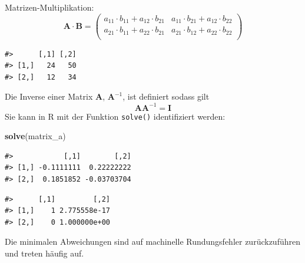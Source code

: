 \documentclass[]{book}
\newenvironment{Shaded}{\begin{snugshade}}{\end{snugshade}}
\newcommand{\KeywordTok}[1]{\textcolor[rgb]{0.13,0.29,0.53}{\textbf{#1}}}
\newcommand{\StringTok}[1]{\textcolor[rgb]{0.31,0.60,0.02}{#1}}
\newcommand{\OperatorTok}[1]{\textcolor[rgb]{0.81,0.36,0.00}{\textbf{#1}}}
\newcommand{\NormalTok}[1]{#1}
\begin{document}
Matrizen-Multiplikation: \[\boldsymbol{A}\cdot\boldsymbol{B}=
\left(
\begin{array}{rrr}                                
a_{11}\cdot b_{11} + a_{12}\cdot b_{21} & a_{11}\cdot b_{21}+a_{12}\cdot b_{22}\\                     a_{21}\cdot b_{11} + a_{22}\cdot b_{21} & a_{21}\cdot b_{12}+a_{22}\cdot b_{22}\\                     
\end{array}
\right)\]

\begin{Shaded}
\end{Shaded}

\begin{verbatim}
#>      [,1] [,2]
#> [1,]   24   50
#> [2,]   12   34
\end{verbatim}

Die Inverse einer Matrix \(\boldsymbol{A}\), \(\boldsymbol{A}^{-1}\),
ist definiert sodass gilt
\[\boldsymbol{A}\boldsymbol{A}^{-1}=\boldsymbol{I}\] Sie kann in R mit
der Funktion \texttt{solve()} identifiziert werden:

\begin{Shaded}
\begin{Highlighting}[]
\KeywordTok{solve}\NormalTok{(matrix_a)}
\end{Highlighting}
\end{Shaded}

\begin{verbatim}
#>            [,1]        [,2]
#> [1,] -0.1111111  0.22222222
#> [2,]  0.1851852 -0.03703704
\end{verbatim}

\begin{Shaded}
\end{Shaded}

\begin{verbatim}
#>      [,1]         [,2]
#> [1,]    1 2.775558e-17
#> [2,]    0 1.000000e+00
\end{verbatim}

Die minimalen Abweichungen sind auf machinelle Rundungsfehler
zurückzuführen und treten häufig auf.
\end{document}
